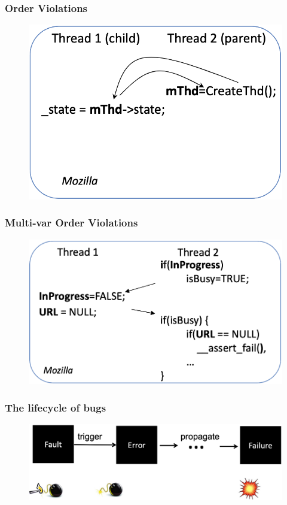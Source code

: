 \begin{frame}[fragile]
    \frametitle{Order Violations}
    \begin{figure}
    \includegraphics[width=0.65\linewidth]{figs/order-violation.png}
    \end{figure}
\end{frame}
% 
% 
\begin{frame}[fragile]
    \frametitle{Multi‐var Order Violations}
    \begin{figure}
    \includegraphics[width=0.8\linewidth]{figs/mutli-variable-ordering-violation.png}
    \end{figure}
\end{frame}
% 
% 
% 
% 
\begin{frame}[fragile]
    \frametitle{The lifecycle of bugs}
    \begin{figure}
    \includegraphics[width=0.9\linewidth]{figs/bug-lifecycle.png}
    \end{figure}
\end{frame}
